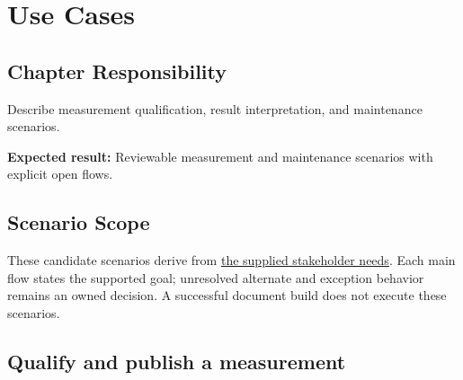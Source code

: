 \chapter{Use Cases}
\section{Chapter Responsibility}
\label{Section:UseCasesResponsibility}
Describe measurement qualification, result interpretation, and maintenance scenarios.

\noindent\textbf{Expected result:} Reviewable measurement and maintenance scenarios with explicit open flows.

\section{Scenario Scope}
These candidate scenarios derive from \hyperref[Table:StakeholderNeeds]{the supplied stakeholder needs}. Each main flow states the supported goal; unresolved alternate and exception behavior remains an owned decision. A successful document build does not execute these scenarios.

\section{Qualify and publish a measurement}

